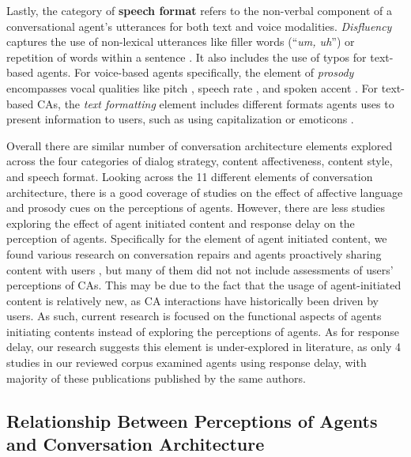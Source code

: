 Lastly, the category of \textbf{speech format} refers to the non-verbal component of a conversational agent's utterances for both text and voice modalities. \textit{Disfluency} captures 
the use of non-lexical utterances like filler words (``\textit{um, uh}'') \cite{hu2021enhancing, jeong2019exploring}\cmt{[56][10]} or repetition of words within a sentence \cite{yang2021effect}\cmt{[72]}. It also includes the use of typos \cite{westerman2019believe}\cmt{[9]} for text-based agents. For voice-based agents specifically, the element of \textit{prosody} encompasses vocal qualities like pitch \cite{habler2019effects, jestin2022effects}\cmt{[63][81]}, speech rate \cite{choi2020nobody}\cmt{[54]}, and spoken accent \cite{feijoo2021effects}\cmt{[70]}. For text-based CAs, the \textit{text formatting} element includes different formats agents uses to present information to users, such as using capitalization \cite{westerman2019believe}\cmt{[9]} or emoticons \cite{kim2019comparing, wilhelm2022keep}\cmt{[89][28]}. 

Overall there are similar number of conversation architecture elements explored across the four categories of dialog strategy, content affectiveness, content style, and speech format. Looking across the 11 different elements of conversation architecture, there is a good coverage of studies on the effect of affective language and prosody cues on the perceptions of agents. However, there are less studies exploring the effect of agent initiated content and response delay on the perception of agents. Specifically for the element of agent initiated content, we found various research on conversation repairs \cite{komatani2010online, reinkemeier2022repair} and agents proactively sharing content with users \cite{dubiel2019inquisitive, zargham2022understanding}, but many of them did not not include assessments of users' perceptions of CAs. This may be due to the fact that the usage of agent-initiated content is relatively new, as CA interactions have historically been driven by users. As such, current research is focused on the functional aspects of agents initiating contents instead of exploring the perceptions of agents. As for response delay, our research suggests this element is under-explored in literature, as only 4 studies in our reviewed corpus examined agents using response delay, with majority of these publications published by the same authors.

\subsection{Relationship Between Perceptions of Agents and Conversation Architecture}

